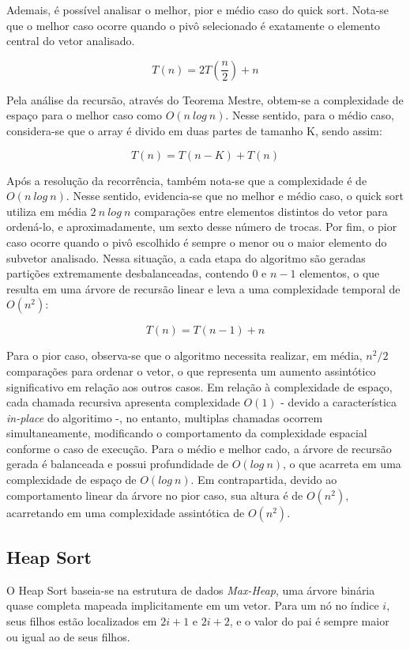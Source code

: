 \documentclass{article}
\begin{document}
        Ademais, é possível analisar o melhor, pior e médio caso do quick sort. 
        Nota-se que o melhor caso ocorre quando o pivô selecionado é exatamente o elemento central do vetor analisado.

        $$
            T(n) = 2T\!\left(\frac{n}{2}\right) + n
        $$

        Pela análise da recursão, através do Teorema Mestre, obtem-se a complexidade de espaço para o melhor caso como $O (n \ log \ n)$. 
        Nesse sentido, para o médio caso, considera-se que o array é divido em duas partes de tamanho K, sendo assim:

        $$
            T(n) = T(n - K) + T(n)
        $$

        Após a resolução da recorrência, também nota-se que a complexidade é de $O (n \ log \ n)$.
        Nesse sentido, evidencia-se que no melhor e médio caso, o quick sort utiliza em média $2 \ n \ log \ n$ comparações entre elementos distintos do vetor para ordená-lo, e aproximadamente, um sexto desse número de trocas.
        Por fim, o pior caso ocorre quando o pivô escolhido é sempre o menor ou o maior elemento do subvetor analisado. 
        Nessa situação, a cada etapa do algoritmo são geradas partições extremamente desbalanceadas, contendo 0 e $n-1$ elementos, o que resulta em uma árvore de recursão linear e leva a uma complexidade temporal de $O(n^2)$:

        $$
            T(n) = T(n - 1) + n
        $$

        Para o pior caso, observa-se que o algoritmo necessita realizar, em média, $n^2 / 2$ comparações para ordenar o vetor, o que representa um aumento assintótico significativo em relação aos outros casos. 
        Em relação à complexidade de espaço, cada chamada recursiva apresenta complexidade $O(1)$ - devido a característica \textit{in-place} do algoritimo -, no entanto, multiplas chamadas ocorrem simultaneamente, modificando o comportamento da complexidade espacial conforme o caso de execução. 
        Para o médio e melhor cado, a árvore de recursão gerada é balanceada e possui profundidade de $O(log \ n)$, o que acarreta em uma complexidade de espaço de $O(log \ n)$.
        Em contrapartida, devido ao comportamento linear da árvore no pior caso, sua altura é de $O(n^2)$, acarretando em uma complexidade assintótica de $O(n^2)$.

 \subsection{Heap Sort}
    O Heap Sort baseia-se na estrutura de dados \textit{Max-Heap}, uma árvore binária quase completa mapeada implicitamente em um vetor. Para um nó no índice $i$, seus filhos estão localizados em $2i + 1$ e $2i + 2$, e o valor do pai é sempre maior ou igual ao de seus filhos.
\end{document}
